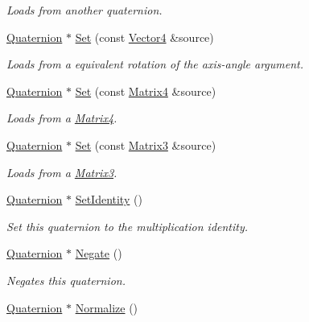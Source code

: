 \begin{DoxyCompactItemize}
\begin{DoxyCompactList}\small\item\em Loads from another quaternion. \end{DoxyCompactList}\item 
\hyperlink{class_flounder_1_1_quaternion}{Quaternion} $\ast$ \hyperlink{class_flounder_1_1_quaternion_a6ddba0d09de5537311bd479b1cebe18b}{Set} (const \hyperlink{class_flounder_1_1_vector4}{Vector4} \&source)
\begin{DoxyCompactList}\small\item\em Loads from a equivalent rotation of the axis-\/angle argument. \end{DoxyCompactList}\item 
\hyperlink{class_flounder_1_1_quaternion}{Quaternion} $\ast$ \hyperlink{class_flounder_1_1_quaternion_acb46e5b52274d76efaa49a756a5fa341}{Set} (const \hyperlink{class_flounder_1_1_matrix4}{Matrix4} \&source)
\begin{DoxyCompactList}\small\item\em Loads from a \hyperlink{class_flounder_1_1_matrix4}{Matrix4}. \end{DoxyCompactList}\item 
\hyperlink{class_flounder_1_1_quaternion}{Quaternion} $\ast$ \hyperlink{class_flounder_1_1_quaternion_a2c4b6359a6910830ef778df6ada382cd}{Set} (const \hyperlink{class_flounder_1_1_matrix3}{Matrix3} \&source)
\begin{DoxyCompactList}\small\item\em Loads from a \hyperlink{class_flounder_1_1_matrix3}{Matrix3}. \end{DoxyCompactList}\item 
\hyperlink{class_flounder_1_1_quaternion}{Quaternion} $\ast$ \hyperlink{class_flounder_1_1_quaternion_a94b5e5eed19489af80203025a4f34f63}{Set\+Identity} ()
\begin{DoxyCompactList}\small\item\em Set this quaternion to the multiplication identity. \end{DoxyCompactList}\item 
\hyperlink{class_flounder_1_1_quaternion}{Quaternion} $\ast$ \hyperlink{class_flounder_1_1_quaternion_aee4bd352c9577236da75b9740988368c}{Negate} ()
\begin{DoxyCompactList}\small\item\em Negates this quaternion. \end{DoxyCompactList}\item 
\hyperlink{class_flounder_1_1_quaternion}{Quaternion} $\ast$ \hyperlink{class_flounder_1_1_quaternion_a4e6c3b7db519156a7ded03a02d943a59}{Normalize} ()

\end{DoxyCompactItemize}
